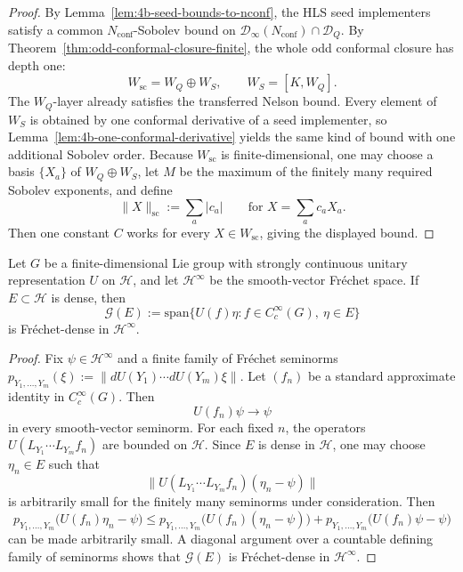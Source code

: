 \begin{proof}
By Lemma~\ref{lem:4b-seed-bounds-to-nconf}, the HLS seed implementers satisfy a
common \(N_{\mathrm{conf}}\)-Sobolev bound on
\(\mathcal D_\infty(N_{\mathrm{conf}})\cap\mathcal D_Q\). By
Theorem~\ref{thm:odd-conformal-closure-finite}, the whole odd conformal closure
has depth one:
\[
  W_{\mathrm{sc}}=W_Q\oplus W_S,
  \qquad
  W_S=[K,W_Q].
\]
The \(W_Q\)-layer already satisfies the transferred Nelson bound. Every element of
\(W_S\) is obtained by one conformal derivative of a seed implementer, so
Lemma~\ref{lem:4b-one-conformal-derivative} yields the same kind of bound with one
additional Sobolev order. Because \(W_{\mathrm{sc}}\) is finite-dimensional, one
may choose a basis \(\{X_a\}\) of \(W_Q\oplus W_S\), let \(M\) be the maximum of
the finitely many required Sobolev exponents, and define
\[
  \|X\|_{\mathrm{sc}}
  :=
  \sum_a |c_a|
  \qquad
  \text{for }
  X=\sum_a c_a X_a.
\]
Then one constant \(C\) works for every \(X\in W_{\mathrm{sc}}\), giving the
displayed bound.
\end{proof}

\begin{lemma}
\label{lem:4b-garding-dense-from-dense-set}
Let \(G\) be a finite-dimensional Lie group with strongly continuous unitary
representation \(U\) on \(\mathcal H\), and let \(\mathcal H^\infty\) be the
smooth-vector Fr\'echet space. If \(E\subset\mathcal H\) is dense, then
\[
\mathcal G(E)
:=
\mathrm{span}\{U(f)\eta:f\in C_c^\infty(G),\ \eta\in E\}
\]
is Fr\'echet-dense in \(\mathcal H^\infty\).
\end{lemma}

\begin{proof}
Fix \(\psi\in\mathcal H^\infty\) and a finite family of Fr\'echet seminorms
\(p_{Y_1,\dots,Y_m}(\xi):=\|dU(Y_1)\cdots dU(Y_m)\xi\|\). Let \((f_n)\) be a
standard approximate identity in \(C_c^\infty(G)\). Then
\[
U(f_n)\psi\longrightarrow \psi
\]
in every smooth-vector seminorm. For each fixed \(n\), the operators
\(U(L_{Y_1}\cdots L_{Y_m}f_n)\) are bounded on \(\mathcal H\). Since \(E\) is dense in
\(\mathcal H\), one may choose \(\eta_n\in E\) such that
\[
\|U(L_{Y_1}\cdots L_{Y_m}f_n)(\eta_n-\psi)\|
\]
is arbitrarily small for the finitely many seminorms under consideration. Then
\[
p_{Y_1,\dots,Y_m}\bigl(U(f_n)\eta_n-\psi\bigr)
\le
p_{Y_1,\dots,Y_m}\bigl(U(f_n)(\eta_n-\psi)\bigr)
+
p_{Y_1,\dots,Y_m}\bigl(U(f_n)\psi-\psi\bigr)
\]
can be made arbitrarily small. A diagonal argument over a countable defining
family of seminorms shows that \(\mathcal G(E)\) is Fr\'echet-dense in
\(\mathcal H^\infty\).
\end{proof}


